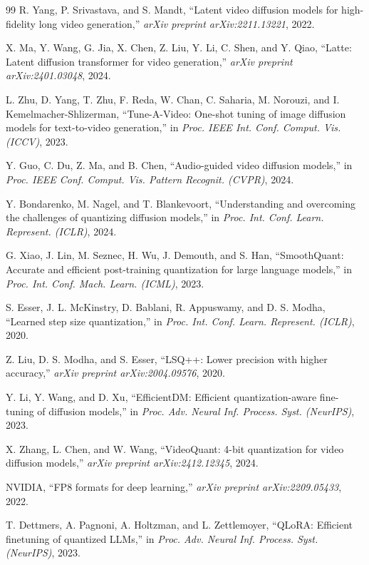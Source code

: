 \documentclass[journal]{IEEEtran}
\theoremstyle{definition}
\theoremstyle{remark}
\begin{document}
\begin{thebibliography}{99}
R. Yang, P. Srivastava, and S. Mandt, ``Latent video diffusion models for high-fidelity long video generation,'' \textit{arXiv preprint arXiv:2211.13221}, 2022.

X. Ma, Y. Wang, G. Jia, X. Chen, Z. Liu, Y. Li, C. Shen, and Y. Qiao, ``Latte: Latent diffusion transformer for video generation,'' \textit{arXiv preprint arXiv:2401.03048}, 2024.

L. Zhu, D. Yang, T. Zhu, F. Reda, W. Chan, C. Saharia, M. Norouzi, and I. Kemelmacher-Shlizerman, ``Tune-A-Video: One-shot tuning of image diffusion models for text-to-video generation,'' in \textit{Proc. IEEE Int. Conf. Comput. Vis. (ICCV)}, 2023.

Y. Guo, C. Du, Z. Ma, and B. Chen, ``Audio-guided video diffusion models,'' in \textit{Proc. IEEE Conf. Comput. Vis. Pattern Recognit. (CVPR)}, 2024.

Y. Bondarenko, M. Nagel, and T. Blankevoort, ``Understanding and overcoming the challenges of quantizing diffusion models,'' in \textit{Proc. Int. Conf. Learn. Represent. (ICLR)}, 2024.

G. Xiao, J. Lin, M. Seznec, H. Wu, J. Demouth, and S. Han, ``SmoothQuant: Accurate and efficient post-training quantization for large language models,'' in \textit{Proc. Int. Conf. Mach. Learn. (ICML)}, 2023.

S. Esser, J. L. McKinstry, D. Bablani, R. Appuswamy, and D. S. Modha, ``Learned step size quantization,'' in \textit{Proc. Int. Conf. Learn. Represent. (ICLR)}, 2020.

Z. Liu, D. S. Modha, and S. Esser, ``LSQ++: Lower precision with higher accuracy,'' \textit{arXiv preprint arXiv:2004.09576}, 2020.

Y. Li, Y. Wang, and D. Xu, ``EfficientDM: Efficient quantization-aware fine-tuning of diffusion models,'' in \textit{Proc. Adv. Neural Inf. Process. Syst. (NeurIPS)}, 2023.

X. Zhang, L. Chen, and W. Wang, ``VideoQuant: 4-bit quantization for video diffusion models,'' \textit{arXiv preprint arXiv:2412.12345}, 2024.

NVIDIA, ``FP8 formats for deep learning,'' \textit{arXiv preprint arXiv:2209.05433}, 2022.

T. Dettmers, A. Pagnoni, A. Holtzman, and L. Zettlemoyer, ``QLoRA: Efficient finetuning of quantized LLMs,'' in \textit{Proc. Adv. Neural Inf. Process. Syst. (NeurIPS)}, 2023.


\end{thebibliography}
\end{document}
